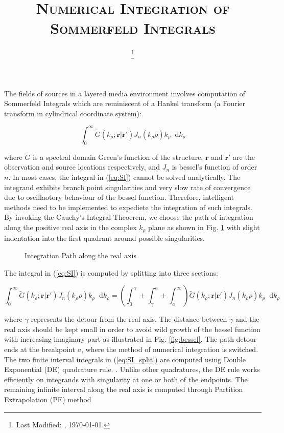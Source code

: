 \documentclass[11pt]{article}
\renewcommand{\v}[1]{\mathbf{#1}} %
\newcommand{\ti}[1]{\tilde{#1}} %
\newcommand{\p}{\rho}  %
\renewcommand{\inf}{\infty}  %
\renewcommand{\^}{\hat}  %
\newcommand*\diff{\mathop{}\!\mathrm{d}} %
\begin{document}
  \title{\textsc{Numerical Integration of Sommerfeld Integrals}\\}
  \date{\footnote{Last Modified: \currenttime, \today.}}
  \maketitle

  The fields of sources in a layered media environment involves computation of Sommerfeld Integrals which are reminiscent of a Hankel transform (a Fourier transform in cylindrical coordinate system):

  \begin{equation}
    \int_{0}^{\inf} \ti{G}(k_{\p}; \v{r}|\v{r}') J_n(k_{\p} \p) k_{\p} \diff{k_{\p}}
    \label{eq:SI}
  \end{equation}

  where $\ti{G}$ is a spectral domain Green's function of the structure, $\v{r}$ and $\v{r}'$ are the observation and source locations respectively, and $J_n$ is bessel's function of order $n$. In most cases, the integral in (\ref{eq:SI}) cannot be solved analytically. The integrand exhibits branch point singularities and very slow rate of convergence due to oscillaotory behaviour of the bessel function. Therefore, intelligent methods need to be implemented to expediete the integration of such integrals. By invoking the Cauchy's Integral Theoerem, \cite[p. 377]{arfken2001mathematical} we choose the path of integration along the positive real axis in the complex $k_{\p}$ plane as shown in Fig. \ref{fig:path} with slight indentation into the first quadrant around possible singularities.
  \cite{golubovic2012efficient,michalski2016efficient}

  \begin{figure}[h!]
    \centering
    
    \caption{Integration Path along the real axis}
    \label{fig:path}
  \end{figure}

The integral in (\ref{eq:SI}) is computed by splitting into three sections:

\begin{equation}
  \int_{0}^{\inf} \ti{G}(k_{\p}; \v{r}|\v{r}') J_n(k_{\p} \p) k_{\p} \diff{k_{\p}} = \left(\int_{0}^{\gamma} + \int_{\gamma}^{a} + \int_{a}^{\inf} \right)
  \ti{G}(k_{\p}; \v{r}|\v{r}') J_n(k_{\p} \p) k_{\p} \diff{k_{\p}}
  \label{eq:SI_split}
\end{equation}

where $\gamma$ represents the detour from the real axis. The distance between $\gamma$ and the real axis should be kept small in order to avoid wild growth of the bessel function with increasing imaginary part as illustrated in Fig. \ref{fig:bessel}. The path detour ends at the breakpoint $a$, where the method of numerical integration is switched. The two finite interval integrals in (\ref{eq:SI_split}) are computed using Double Exponential (DE) quadrature rule. \cite{takahasi1974double}. Unlike other quadratures, the DE rule works efficiently on integrands with singularity at one or both of the endpoints. \cite{bailey2005comparison, mori2005discovery} The remaining infinite interval along the real axis is computed through Partition Extrapolation (PE) method
\end{document}
